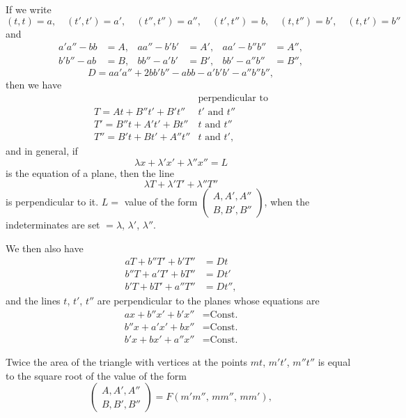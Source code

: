 
If we write
{\small\[
(t,t) = a,\quad (t',t') = a',\quad (t'',t'') = a'',\quad (t',t'') = b,\quad (t,t'') = b',\quad (t,t') = b''
\]}
and
\[\begin{aligned}
a'a'' - bb &= A, & aa'' - b'b' &= A', & aa' - b''b'' &= A'', \\
b'b'' - ab &= B, & bb'' - a'b' &= B', & bb' - a''b'' &= B'',
\end{aligned}\]
\[
D = aa'a'' + 2bb'b'' - abb - a'b'b' - a''b''b'',
\]
then we have
\[
\begin{array}{ll}
 & \text{perpendicular to}\\
 T=At+B''t'+B't'' & t'\text{ and }t''\\
 T'=B''t+A't'+Bt'' & t\text{ and }t''\\
 T''=B't+Bt'+A''t'' & t\text{ and }t',
\end{array}
\]
and in general, if
\[
\lambda x + \lambda' x' + \lambda'' x'' = L
\]
is the equation of a plane, then the line
\[
\lambda T + \lambda' T' + \lambda'' T''
\]
is perpendicular to it. $L =$ value of the form $\begin{pmatrix} A, A', A'' \\ B, B', B'' \end{pmatrix}$,
when the indeterminates are set $= \lambda$, $\lambda'$, $\lambda''$.

We then also have
\[\begin{aligned}
aT + b''T' + b'T'' &= Dt \\
b''T + a'T' + bT'' &= Dt' \\
b'T + bT' + a''T'' &= Dt'',
\end{aligned}\]
and the lines $t$, $t'$, $t''$ are perpendicular to the planes whose equations are
\[\begin{aligned}
ax + b''x' + b'x'' &= \text{Const.} \\
b''x + a'x' + bx'' &= \text{Const.} \\
b'x + bx' + a''x'' &= \text{Const.}
\end{aligned}\]

Twice the area of the triangle with vertices at the points $mt$, $m't'$, $m''t''$ is equal to
the square root of the value of the form
\[
\begin{pmatrix} A, A', A'' \\ B, B', B'' \end{pmatrix} = F(m'm'',\, mm'',\, mm'),
\]
